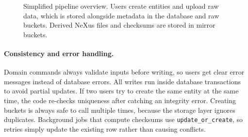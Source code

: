 \begin{figure}[h]
	\centering
	\caption{Simplified pipeline overview. Users create entities and upload raw data, which is stored alongside metadata in the database and raw buckets. Derived NeXus files and checksums are stored in mirror buckets.}
	\label{fig:pipeline-overview}
\end{figure}

\paragraph{Consistency and error handling.}
Domain commands always validate inputs before writing, so users get clear error messages instead of database errors.  
All writes run inside database transactions to avoid partial updates.  
If two users try to create the same entity at the same time, the code re-checks uniqueness after catching an integrity error.  
Creating buckets is always safe to call multiple times, because the storage layer ignores duplicates.  
Background jobs that compute checksums use \texttt{update\_or\_create}, so retries simply update the existing row rather than causing conflicts.

